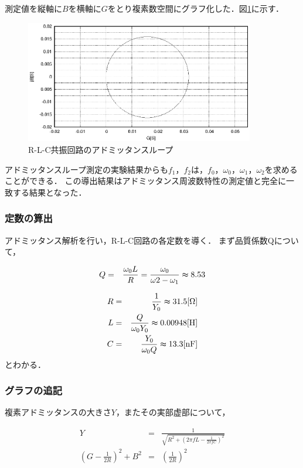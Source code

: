 \documentclass[dvipdfmx,titlepage,a4j]{jsarticle}  %
\numberwithin{equation}{section}
\begin{document}
測定値を縦軸に$B$を横軸に$G$をとり複素数空間にグラフ化した．図\ref{fig:A_GB.eps}に示す．
\begin{figure}[H]
  \centering
  \includegraphics[width=10cm]{../gnuplot/A_GB.eps}
  \caption{R-L-C共振回路のアドミッタンスループ}
  \label{fig:A_GB.eps}
\end{figure}

アドミッタンスループ測定の実験結果からも$f_1$，$f_2$は，$f_0$，$\omega_0$，$\omega_1$，$\omega_2$を求めることができる．
この導出結果はアドミッタンス周波数特性の測定値と完全に一致する結果となった．

\subsubsection{定数の算出}
アドミッタンス解析を行い，R-L-C回路の各定数を導く．
まず品質係数Qについて，

\begin{eqnarray}
  Q &=& \frac{\omega_0 L}{R} = \frac{\omega_0}{\omega2 - \omega_1} \thickapprox 8.53\\
\end{eqnarray}

\begin{eqnarray}
  R &=& \frac{1}{Y_0} \thickapprox 31.5 \mathrm{[\Omega]}\\
  L &=& \frac{Q}{\omega_0 Y_0} \thickapprox 0.00948 \mathrm{[H]}\\
  C &=& \frac{Y_0}{\omega_0 Q} \thickapprox 13.3 \mathrm{[nF]}
\end{eqnarray}
とわかる．

\subsubsection{グラフの追記}
複素アドミッタンスの大きさ$Y$，またその実部虚部について，

\begin{eqnarray}
  Y &=& \frac{1}{\sqrt{R^2 + \left(2\pi f L - \frac{1}{2\pi f C}\right)^2}}\\
  \left(G - \frac{1}{2R}\right)^2 + B^2 &=& \left(\frac{1}{2R}\right)^2\\
\end{eqnarray}
\end{document}
